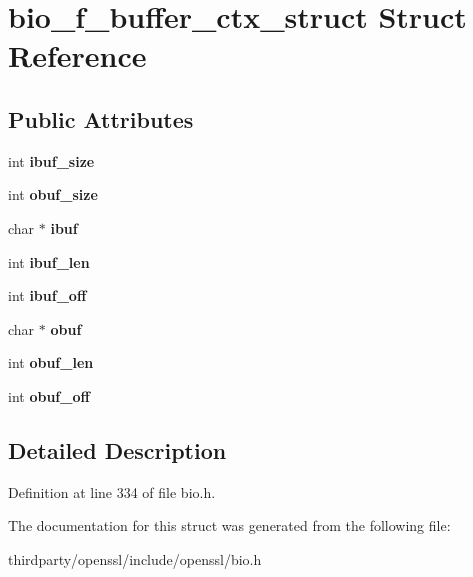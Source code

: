 \hypertarget{structbio__f__buffer__ctx__struct}{}\section{bio\+\_\+f\+\_\+buffer\+\_\+ctx\+\_\+struct Struct Reference}
\label{structbio__f__buffer__ctx__struct}
\subsection*{Public Attributes}
\begin{DoxyCompactItemize}
\item 
\mbox{\label{structbio__f__buffer__ctx__struct_a2ef352eaf33c4d0414c494054d43a795}} 
int {\bfseries ibuf\+\_\+size}
\item 
\mbox{\label{structbio__f__buffer__ctx__struct_ac054193e554cf659d638b00484ba3b07}} 
int {\bfseries obuf\+\_\+size}
\item 
\mbox{\label{structbio__f__buffer__ctx__struct_a7d1c4d9f2365e5f41ae5dc3abef7a489}} 
char $\ast$ {\bfseries ibuf}
\item 
\mbox{\label{structbio__f__buffer__ctx__struct_aeac265d0eb617edf027d714cb22bee72}} 
int {\bfseries ibuf\+\_\+len}
\item 
\mbox{\label{structbio__f__buffer__ctx__struct_a4a05bfddcb84c53b98df8cf72d7626a0}} 
int {\bfseries ibuf\+\_\+off}
\item 
\mbox{\label{structbio__f__buffer__ctx__struct_a3b756daa7e6784f12e178c2f73b6cbe4}} 
char $\ast$ {\bfseries obuf}
\item 
\mbox{\label{structbio__f__buffer__ctx__struct_aa405c5c91239978aeabda2f9537db899}} 
int {\bfseries obuf\+\_\+len}
\item 
\mbox{\label{structbio__f__buffer__ctx__struct_a33d8e302dcb91873af9ed993094e1960}} 
int {\bfseries obuf\+\_\+off}
\end{DoxyCompactItemize}


\subsection{Detailed Description}


Definition at line 334 of file bio.\+h.



The documentation for this struct was generated from the following file\+:\begin{DoxyCompactItemize}
\item 
thirdparty/openssl/include/openssl/bio.\+h\end{DoxyCompactItemize}
